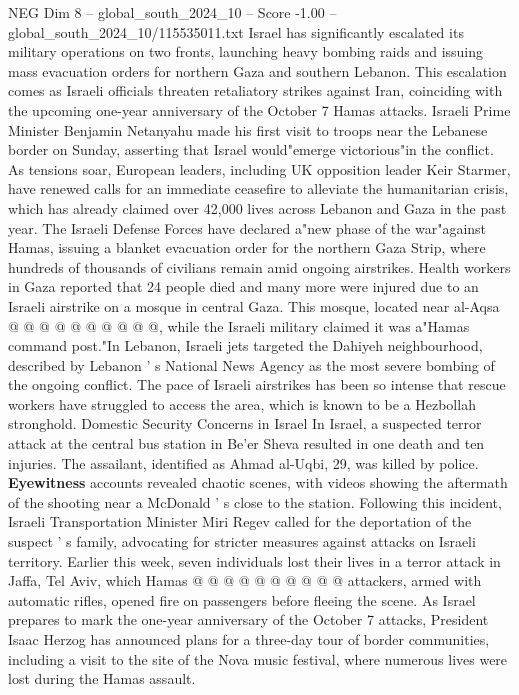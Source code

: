 \begin{textsample}{NEG Dim 8 – global\_south\_2024\_10 – Score -1.00 – global\_south\_2024\_10/115535011.txt}  \label{ex:f8_neg_195}
Israel has significantly escalated its military operations on two fronts, launching heavy bombing raids and issuing mass evacuation orders for northern Gaza and southern Lebanon.
This escalation comes as Israeli officials threaten retaliatory strikes against Iran, coinciding with the upcoming one-year anniversary of the October 7 Hamas attacks.
Israeli Prime Minister Benjamin Netanyahu made his first visit to troops near the Lebanese border on Sunday, asserting that Israel would"emerge victorious"in the conflict.
As tensions soar, European leaders, including UK opposition leader Keir Starmer, have renewed calls for an immediate ceasefire to alleviate the humanitarian crisis, which has already claimed over 42,000 lives across Lebanon and Gaza in the past year.
The Israeli Defense Forces have declared a"new phase of the war"against Hamas, issuing a blanket evacuation order for the northern Gaza Strip, where hundreds of thousands of civilians remain amid ongoing airstrikes.
Health workers in Gaza reported that 24 people died and many more were injured due to an Israeli airstrike on a mosque in central Gaza.
This mosque, located near al-Aqsa @ @ @ @ @ @ @ @ @ @, while the Israeli military claimed it was a"Hamas command post."In Lebanon, Israeli jets targeted the Dahiyeh neighbourhood, described by Lebanon ' s National News Agency as the most severe bombing of the ongoing conflict.
The pace of Israeli airstrikes has been so intense that rescue workers have struggled to access the area, which is known to be a Hezbollah stronghold.
Domestic Security Concerns in Israel In Israel, a suspected terror attack at the central bus station in Be'er Sheva resulted in one death and ten injuries.
The assailant, identified as Ahmad al-Uqbi, 29, was killed by police. \textbf{Eyewitness} accounts revealed chaotic scenes, with videos showing the aftermath of the shooting near a McDonald ' s close to the station.
Following this incident, Israeli Transportation Minister Miri Regev called for the deportation of the suspect ' s family, advocating for stricter measures against attacks on Israeli territory.
Earlier this week, seven individuals lost their lives in a terror attack in Jaffa, Tel Aviv, which Hamas @ @ @ @ @ @ @ @ @ @ attackers, armed with automatic rifles, opened fire on passengers before fleeing the scene.
As Israel prepares to mark the one-year anniversary of the October 7 attacks, President Isaac Herzog has announced plans for a three-day tour of border communities, including a visit to the site of the Nova music festival, where numerous lives were lost during the Hamas assault.

\end{textsample}
